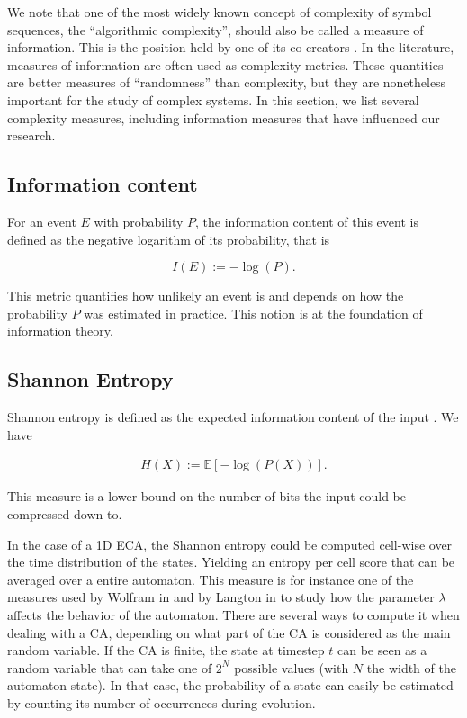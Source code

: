 We note that one of the most widely known concept of complexity of symbol
sequences, the ``algorithmic complexity'', should also be called a measure of
information. This is the position held by one of its co-creators
\parencite{chaitinInformationRandomnessIncompleteness1990}. In the literature,
measures of information are often used as complexity metrics. These quantities
are better measures of ``randomness'' than complexity, but they are nonetheless
important for the study of complex systems. In this section, we list several
complexity measures, including information measures that have influenced our
research.

\subsection{Information content}
For an event $E$ with probability $P$, the information content of this event is
defined as the negative logarithm of its probability, that is

\begin{equation}
  I(E) :=  -\log(P).
\end{equation}

This metric quantifies how unlikely an event is and depends on how the
probability $P$ was estimated in practice. This notion is at the foundation of
information theory.

\subsection{Shannon Entropy}
Shannon entropy is defined as the expected information content of the input
\parencite{shannonMathematicalTheoryCommunication1975}. We have

\begin{align*}
  H(X) := \mathbb{E}[-\log(P(X))].
\end{align*}

This measure is a lower bound on the number of bits the input could be
compressed down to.

In the case of a 1D \ac{ECA}, the Shannon entropy could be computed cell-wise
over the time distribution of the states. Yielding an entropy per cell score
that can be averaged over a entire automaton. This measure is for instance one
of the measures used by Wolfram in
\parencite{wolframStatisticalMechanicsCellular1983} and by Langton in
\parencite{langtonComputationEdgeChaos1990} to study how the parameter $\lambda$
affects the behavior of the automaton. There are several ways to compute it when
dealing with a CA, depending on what part of the CA is considered as the main
random variable. If the CA is finite, the state at timestep $t$ can be seen as a
random variable that can take one of $2^N$ possible values (with $N$ the width
of the automaton state). In that case, the probability of a state can easily be
estimated by counting its number of occurrences during evolution.

